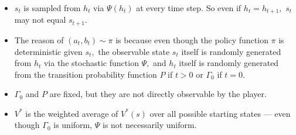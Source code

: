 \documentclass[11pt,a4paper]{article}
\begin{document}
\begin{itemize}[itemsep=0.3em]
    \item $s_t$ is sampled from $h_t$ via $\Psi(h_t)$ at every time step. So even if $h_t = h_{t+1},$ $s_t$ may not equal $s_{t+1}.$
    \item The reason of $(a_t,b_t) \sim \pi$ is because even though the policy function $\pi$ is deterministic given $s_t,$ the observable state $s_t$ itself is randomly generated from $h_t$ via the stochastic function $\Psi,$ and $h_t$ itself is randomly generated from the transition probability function $P$ if $t > 0$ or $\Gamma_0$ if $t=0.$
    \item $\Gamma_0$ and $P$ are fixed, but they are not directly observable by the player.
    \item $V^*$ is the weighted average of $V^*(s)$ over all possible starting states --- even though $\Gamma_0$ is uniform, $\Psi$ is not necessarily uniform.
\end{itemize}
\end{document}

